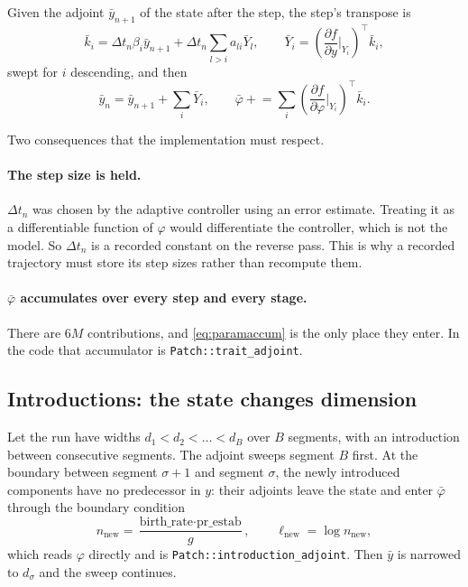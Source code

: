 \documentclass[11pt,a4paper]{article}
\newcommand{\code}[1]{\texttt{\small #1}}
\newcommand{\adj}[1]{\bar{#1}}
\newcommand{\dd}[2]{\frac{\partial #1}{\partial #2}}
\begin{document}
Given the adjoint $\adj{y}_{n+1}$ of the state after the step, the step's
transpose is
\begin{equation}
\adj{k}_i = \Delta t_n \beta_i \adj{y}_{n+1}
  + \Delta t_n \sum_{l>i} a_{li} \adj{Y}_l,
\qquad
\adj{Y}_i = \left(\dd{f}{y}\Big|_{Y_i}\right)^{\!\!\top} \adj{k}_i ,
\label{eq:stageadj}
\end{equation}
swept for $i$ descending, and then
\begin{equation}
\adj{y}_n = \adj{y}_{n+1} + \sum_i \adj{Y}_i,
\qquad
\adj{\varphi} \mathrel{+}= \sum_i \left(\dd{f}{\varphi}\Big|_{Y_i}\right)^{\!\!\top}
\adj{k}_i .
\label{eq:paramaccum}
\end{equation}

Two consequences that the implementation must respect.

\paragraph{The step size is held.} $\Delta t_n$ was chosen by the adaptive
controller using an error estimate. Treating it as a differentiable function of
$\varphi$ would differentiate the controller, which is not the model. So
$\Delta t_n$ is a recorded constant on the reverse pass. This is why a recorded
trajectory must store its step sizes rather than recompute them.

\paragraph{$\adj\varphi$ accumulates over every step and every stage.} There are
$6M$ contributions, and \eqref{eq:paramaccum} is the only place they enter. In the
code that accumulator is \code{Patch::trait\_adjoint}.

\subsection{Introductions: the state changes dimension}

Let the run have widths $d_1 < d_2 < \dots < d_B$ over $B$ segments, with an
introduction between consecutive segments. The adjoint sweeps segment $B$ first.
At the boundary between segment $\sigma+1$ and segment $\sigma$, the newly
introduced components have no predecessor in $y$: their adjoints leave the state
and enter $\adj\varphi$ through the boundary condition
\begin{equation}
n_{\text{new}} = \frac{\text{birth\_rate} \cdot \text{pr\_estab}}{g},
\qquad
\ell_{\text{new}} = \log n_{\text{new}} ,
\label{eq:boundary}
\end{equation}
which reads $\varphi$ directly and is \code{Patch::introduction\_adjoint}. Then
$\adj y$ is narrowed to $d_\sigma$ and the sweep continues.
\end{document}
